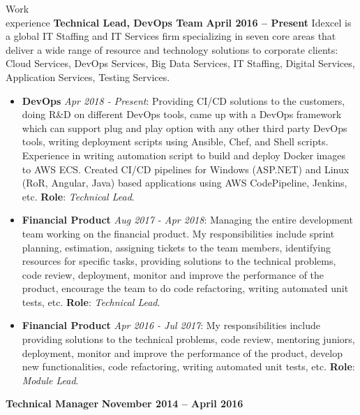 \documentclass{resume}
\begin{document}
\begin{category}{Work \\experience}
  \citemnobullet \textbf{Technical Lead, DevOps Team} \hfill \textbf{April 2016 -- Present}
  \citemnobullet Idexcel is a global IT Staffing and IT Services firm specializing in seven core areas that deliver a wide range of resource and technology solutions to corporate clients: Cloud Services, DevOps Services, Big Data Services, IT Staffing, Digital Services, Application Services, Testing Services.
  \begin{itemize}
  \item \textbf{DevOps} {\em Apr 2018 - Present}: Providing CI/CD solutions to the customers, doing R\&D on different DevOps tools, came up with a DevOps framework which can support plug and play option with any other third party DevOps tools, writing deployment scripts using Ansible, Chef, and Shell scripts. Experience in writing automation script to build and deploy Docker images to AWS ECS. Created CI/CD pipelines for Windows (ASP.NET) and Linux (RoR, Angular, Java) based applications using AWS CodePipeline, Jenkins, etc.  \textbf{Role}: {\em Technical Lead}.
  \end{itemize}
  \begin{itemize}
  \item \textbf{Financial Product} {\em Aug 2017 - Apr 2018}: Managing the entire development team working on the financial product. My responsibilities include sprint planning, estimation, assigning tickets to the team members, identifying resources for specific tasks, providing solutions to the technical problems, code review, deployment, monitor and improve the performance of the product, encourage the team to do code refactoring, writing automated unit tests, etc. \textbf{Role}: {\em Technical Lead}.
  \end{itemize}
  \begin{itemize}
  \item \textbf{Financial Product} {\em Apr 2016 - Jul 2017}: My responsibilities include providing solutions to the technical problems, code review, mentoring juniors, deployment, monitor and improve the performance of the product, develop new functionalities, code refactoring, writing automated unit tests, etc. \textbf{Role}: {\em Module Lead}.
  \end{itemize}
  \citemnobullet \textbf{Technical Manager} \hfill \textbf{November 2014 -- April 2016}

\end{category}
\end{document}
